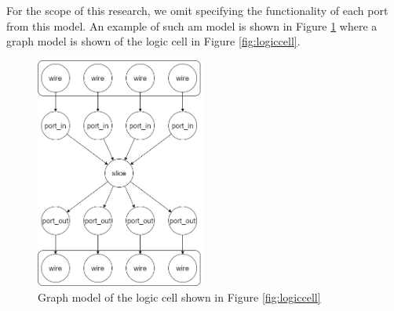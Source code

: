 For the scope of this research, we omit specifying the functionality of each port from this model. An example of such am model is shown in Figure \ref{fig:graphmodel-logiccell} where a graph model is shown of the logic cell in Figure \ref{fig:logiccell}.

\begin{figure}
\centering
\includegraphics[width=0.5\textwidth]{images/modelOfCell.png}
\caption{Graph model of the logic cell shown in Figure \ref{fig:logiccell}}
\label{fig:graphmodel-logiccell}
\end{figure}
